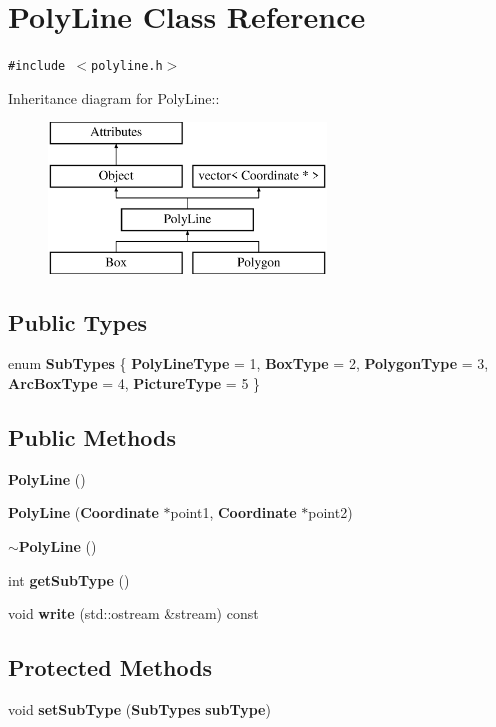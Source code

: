 \section{Poly\-Line Class Reference}
\label{classPolyLine}
{\tt \#include $<$polyline.h$>$}

Inheritance diagram for Poly\-Line::\begin{figure}[H]
\begin{center}
\leavevmode
\includegraphics[height=4cm]{classPolyLine}
\end{center}
\end{figure}
\subsection*{Public Types}
\begin{CompactItemize}
\item 
enum {\bf Sub\-Types} \{ {\bf Poly\-Line\-Type} =   1, 
{\bf Box\-Type} =  2, 
{\bf Polygon\-Type} =  3, 
{\bf Arc\-Box\-Type} =  4, 
{\bf Picture\-Type} =  5
 \}
\end{CompactItemize}
\subsection*{Public Methods}
\begin{CompactItemize}
\item 
{\bf Poly\-Line} ()
\item 
{\bf Poly\-Line} ({\bf Coordinate} $\ast$point1, {\bf Coordinate} $\ast$point2)
\item 
{\bf $\sim$Poly\-Line} ()
\item 
int {\bf get\-Sub\-Type} ()
\item 
void {\bf write} (std::ostream \&stream) const
\end{CompactItemize}
\subsection*{Protected Methods}
\begin{CompactItemize}
\item 
void {\bf set\-Sub\-Type} ({\bf Sub\-Types} {\bf sub\-Type})
\end{CompactItemize}
